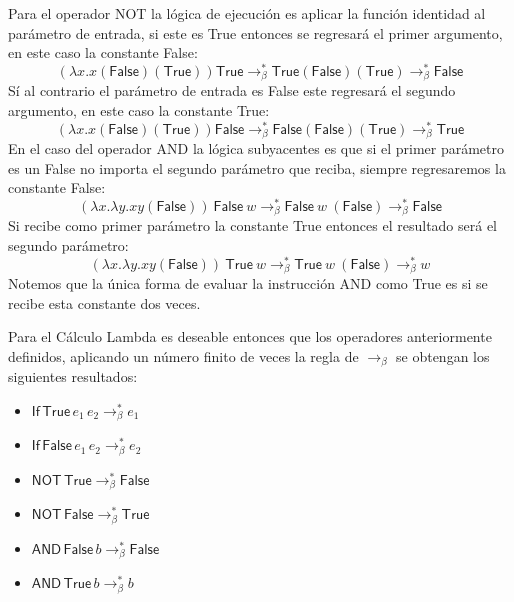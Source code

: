     Para el operador \textsf{NOT} la lógica de ejecución es aplicar la función identidad al parámetro de entrada, si este es \textsf{True} entonces se regresará el primer argumento, en este caso la constante \textsf{False}: \[ (\lambda x.x (\textsf{False})(\textsf{True}))\textsf{True} \to_\beta^* \textsf{True}(\textsf{False})(\textsf{True}) \to_\beta^* \textsf{False}\] 
	Sí al contrario el parámetro de entrada es \textsf{False} este regresará el segundo argumento, en este caso la constante \textsf{True}: \[ (\lambda x.x (\textsf{False})(\textsf{True}))\textsf{False} \to_\beta^* \textsf{False}(\textsf{False})(\textsf{True}) \to_\beta^* \textsf{True}\]
    En el caso del operador \textsf{AND} la lógica subyacentes es que si el primer parámetro es un \textsf{False} no importa el segundo parámetro que reciba, siempre regresaremos la constante \textsf{False}:
\[ (\lambda x.\lambda y. xy (\textsf{False}))\ \textsf{False}\  w \to_\beta^* \textsf{False}\ w\ (\textsf{False}) \to_\beta^* \textsf{False}  \]
Si recibe como primer parámetro la constante \textsf{True} entonces el resultado será el segundo parámetro:
\[ (\lambda x.\lambda y. xy (\textsf{False}))\ \textsf{True}\  w \to_\beta^* \textsf{True}\ w\ (\textsf{False}) \to_\beta^* w  \]
Notemos que la única forma de evaluar la instrucción \textsf{AND} como \textsf{True} es si se recibe esta constante dos veces.

Para el Cálculo Lambda es deseable entonces que los operadores anteriormente definidos, aplicando un número finito de veces la regla de $\to_\beta$ se obtengan los siguientes resultados:
   \begin{center}

        \begin{itemize} \centering
            \item $\mathsf{If}\,\textsf{True}\,e_1\,e_2 \to_\beta^* e_1$ 
            \item $\mathsf{If}\,\textsf{False}\,e_1\,e_2 \to_\beta^* e_2$ 
            \item $\mathsf{NOT}\,\textsf{True}\to_\beta^* \textsf{False}$
            \item $\mathsf{NOT}\,\textsf{False}\to_\beta^* \textsf{True}$
            \item $\mathsf{AND}\,\textsf{False}\,b\to_\beta^* \textsf{False}$
            \item $\mathsf{AND}\,\textsf{True}\,b\to_\beta^* b$
        \end{itemize}
   \end{center} 

